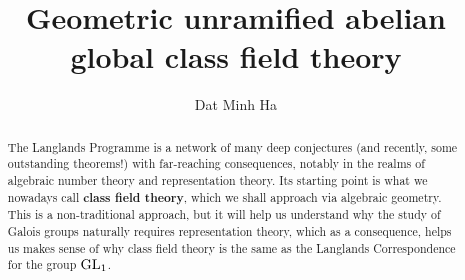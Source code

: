 

\setcounter{section}{-1}





    \title{Geometric unramified abelian global class field theory}
    
    \author{Dat Minh Ha}
    \maketitle
    
    \begin{abstract}
        The Langlands Programme is a network of many deep conjectures (and recently, some outstanding theorems!) with far-reaching consequences, notably in the realms of algebraic number theory and representation theory. Its starting point is what we nowadays call \textbf{class field theory}, which we shall approach via algebraic geometry. This is a non-traditional approach, but it will help us understand why the study of Galois groups naturally requires representation theory, which as a consequence, helps us makes sense of why class field theory is the same as the Langlands Correspondence for the group $\mathrm{GL}_1$.
    \end{abstract}
    
    {
      \hypersetup{} 
      \tableofcontents %
    }

